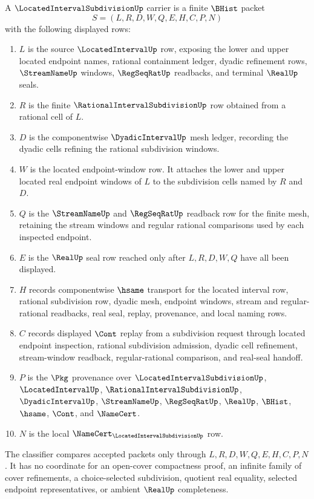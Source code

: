 \begin{definition}
\label{def:located-interval-subdivision-carrier}
A $\LocatedIntervalSubdivisionUp$ carrier is a finite $\BHist$ packet
$$
S=(L,R,D,W,Q,E,H,C,P,N)
$$
with the following displayed rows:
\begin{enumerate}
\item $L$ is the source $\LocatedIntervalUp$ row, exposing the lower and upper located endpoint names, rational containment ledger, dyadic refinement rows, $\StreamNameUp$ windows, $\RegSeqRatUp$ readbacks, and terminal $\RealUp$ seals.
\item $R$ is the finite $\RationalIntervalSubdivisionUp$ row obtained from a rational cell of $L$.
\item $D$ is the componentwise $\DyadicIntervalUp$ mesh ledger, recording the dyadic cells refining the rational subdivision windows.
\item $W$ is the located endpoint-window row. It attaches the lower and upper located real endpoint windows of $L$ to the subdivision cells named by $R$ and $D$.
\item $Q$ is the $\StreamNameUp$ and $\RegSeqRatUp$ readback row for the finite mesh, retaining the stream windows and regular rational comparisons used by each inspected endpoint.
\item $E$ is the $\RealUp$ seal row reached only after $L,R,D,W,Q$ have all been displayed.
\item $H$ records componentwise $\hsame$ transport for the located interval row, rational subdivision row, dyadic mesh, endpoint windows, stream and regular-rational readbacks, real seal, replay, provenance, and local naming rows.
\item $C$ records displayed $\Cont$ replay from a subdivision request through located endpoint inspection, rational subdivision admission, dyadic cell refinement, stream-window readback, regular-rational comparison, and real-seal handoff.
\item $P$ is the $\Pkg$ provenance over $\LocatedIntervalSubdivisionUp$, $\LocatedIntervalUp$, $\RationalIntervalSubdivisionUp$, $\DyadicIntervalUp$, $\StreamNameUp$, $\RegSeqRatUp$, $\RealUp$, $\BHist$, $\hsame$, $\Cont$, and $\NameCert$.
\item $N$ is the local $\NameCert_{\LocatedIntervalSubdivisionUp}$ row.
\end{enumerate}
The classifier compares accepted packets only through $L,R,D,W,Q,E,H,C,P,N$. It has no coordinate for an open-cover compactness proof, an infinite family of cover refinements, a choice-selected subdivision, quotient real equality, selected endpoint representatives, or ambient $\RealUp$ completeness.
\end{definition}

